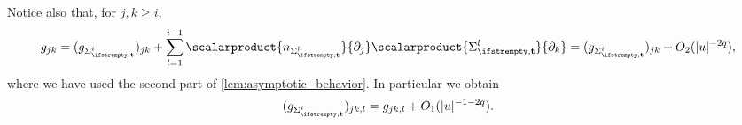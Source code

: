 \documentclass[draft]{amsart}
\newcommand*{\mathcomma}{,}
\newcommand*{\mathfullstop}{.}
\newcommand{\evaluateat}[2]{\left.#1\right\rvert_{#2}}
\DeclarePairedDelimiter{\abs}{\lvert}{\rvert} %
\newcommand{\todomark}{%
    \colorbox{purple}{%
        \textnormal\ttfamily\bfseries\color{white}%
        TODO%
    }%
}
\newcommand{\todo}[1][]{%
    \ifstrempty{#1}{%
        \def\todotext{Todo}%
    }{%
        \def\todotext{Todo: #1}%
    }%
    \todomark\,%
    {%
        \marginpar{%
            \raggedright\normalfont\sffamily\scriptsize\todotext%
        }%
    }%
}
\begin{document}
Notice also that, for \( j,k\geq i \),
\begin{equation}
    g_{jk}=(g_{\nls^i})_{jk}+\sum_{l=1}^{i-1}\scalarproduct{n_{\nls^l}}{\partial_j}\scalarproduct{\nls^l}{\partial_k}=(g_{\nls^i})_{jk}+O_2(\abs{u}^{-2q}),\label{eq:nested_level_set_metric_asymptotically_flat}
\end{equation}
where we have used the second part of \cref{lem:asymptotic_behavior}. In particular we obtain
\begin{equation}\label{eq:nested_level_set_metric_asymptote}
    (g_{\nls^i})_{jk,l}=g_{jk,l}+O_1(\abs{u}^{-1-2q}).
\end{equation}

\end{document}
